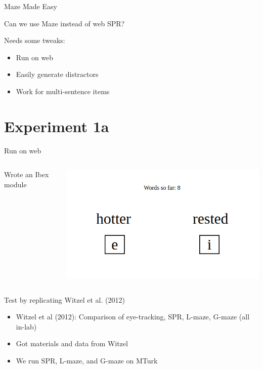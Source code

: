 \documentclass[ 12pt, xcolor=beamer,table,usenames,dvipsnames, ignorenonframetext, ngerman]{beamer}
\begin{document}
\begin{frame}{Maze Made Easy}
	
	Can we use Maze instead of web SPR?\pause
	
	\medskip
	
	Needs some tweaks:\pause
	\begin{itemize}
		\item Run on web \pause
		\item Easily generate distractors \pause
		\item Work for multi-sentence items
	\end{itemize} 
	
\end{frame}

\section{Experiment 1a}
\begin{frame}{Run on web}
	
	\pause
	\begin{columns}
		\begin{column}{0.5\textwidth}
				Wrote an Ibex module
		\end{column}
		\begin{column}{0.5\textwidth} 
			\begin{center}\includegraphics[width=\textwidth]{../Images/screenshot.png} \end{center}\pause
		\end{column}
	\end{columns}

Test by replicating Witzel et al. (2012)
\begin{itemize}
	\item Witzel et al (2012): Comparison of eye-tracking, SPR, L-maze, G-maze (all in-lab)
	\item Got materials and data from Witzel
	\item We run SPR, L-maze, and G-maze on MTurk
\end{itemize}
\end{frame}
\end{document}

